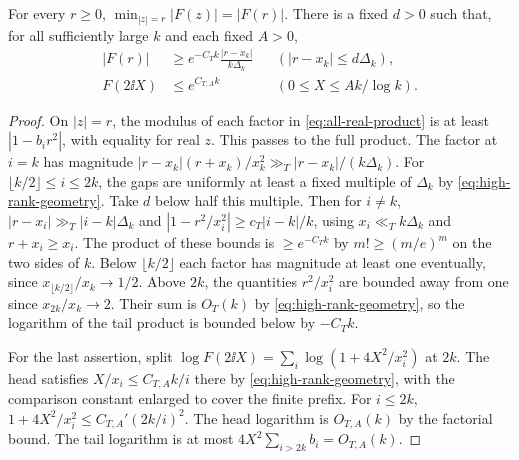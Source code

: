 \begin{lemma}\label{lem:high-rank-circle}
For every \(r\ge0\), \(\min_{|z|=r}|F(z)|=|F(r)|\).
There is a fixed \(d>0\) such that, for all sufficiently large
\(k\) and each fixed \(A>0\),
\begin{equation}\label{eq:direct-growth}
\begin{aligned}
 |F(r)|&\ge e^{-C_T k}\frac{|r-x_k|}{k\Delta_k}
             && (|r-x_k|\le d\Delta_k),\\
 F(2\ii X)&\le e^{C_{T,A}k}
             && (0\le X\le A k/\log k).
\end{aligned}
\end{equation}
\end{lemma}
\begin{proof}
On \(|z|=r\), the modulus of each factor in \eqref{eq:all-real-product}
is at least \(|1-b_i r^2|\), with equality for real \(z\). This
passes to the full product. The factor at \(i=k\) has magnitude
\(|r-x_k|(r+x_k)/x_k^2\gg_T |r-x_k|/(k\Delta_k)\).
For \(\lfloor k/2\rfloor\le i\le2k\), the gaps are uniformly at
least a fixed multiple of \(\Delta_k\) by \eqref{eq:high-rank-geometry}.
Take \(d\) below half this multiple. Then for \(i\ne k\),
\(|r-x_i|\gg_T |i-k|\Delta_k\) and
\(|1-r^2/x_i^2|\ge c_T |i-k|/k\), using \(x_i\ll_T k\Delta_k\)
and \(r+x_i\ge x_i\). The product of these bounds is
\(\ge e^{-C_T k}\) by \(m!\ge(m/e)^m\) on the two sides of \(k\).
Below \(\lfloor k/2\rfloor\) each factor has magnitude at least one
eventually, since \(x_{\lfloor k/2\rfloor}/x_k\to1/2\).
Above \(2k\), the quantities \(r^2/x_i^2\) are bounded away
from one since \(x_{2k}/x_k\to2\). Their sum is \(O_T(k)\) by
\eqref{eq:high-rank-geometry}, so the logarithm of the tail product
is bounded below by \(-C_T k\).

For the last assertion, split
\(\log F(2\ii X)=\sum_i\log(1+4X^2/x_i^2)\) at \(2k\).
The head satisfies \(X/x_i\le C_{T,A}k/i\) there by
\eqref{eq:high-rank-geometry}, with the comparison constant enlarged
to cover the finite prefix. For \(i\le2k\), \(1+4X^2/x_i^2\le
C_{T,A}'(2k/i)^2\). The head logarithm is \(O_{T,A}(k)\) by the
factorial bound. The tail logarithm is at most
\(4X^2\sum_{i>2k} b_i=O_{T,A}(k)\).
\end{proof}

